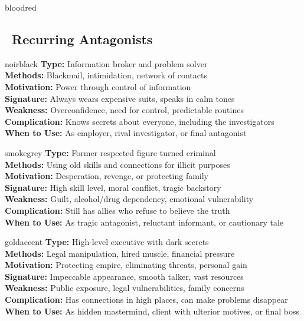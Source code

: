 \documentclass[11pt]{article}
\begin{document}
\begin{noirsection}{bloodred}
\subsection*{\faSkull\ Recurring Antagonists}

\begin{suspectbox}{noirblack}
\textbf{Type:} Information broker and problem solver\\
\textbf{Methods:} Blackmail, intimidation, network of contacts\\
\textbf{Motivation:} Power through control of information\\
\textbf{Signature:} Always wears expensive suits, speaks in calm tones\\
\textbf{Weakness:} Overconfidence, need for control, predictable routines\\
\textbf{Complication:} Knows secrets about everyone, including the investigators\\
\textbf{When to Use:} As employer, rival investigator, or final antagonist
\end{suspectbox}

\begin{suspectbox}{smokegrey}
\textbf{Type:} Former respected figure turned criminal\\
\textbf{Methods:} Using old skills and connections for illicit purposes\\
\textbf{Motivation:} Desperation, revenge, or protecting family\\
\textbf{Signature:} High skill level, moral conflict, tragic backstory\\
\textbf{Weakness:} Guilt, alcohol/drug dependency, emotional vulnerability\\
\textbf{Complication:} Still has allies who refuse to believe the truth\\
\textbf{When to Use:} As tragic antagonist, reluctant informant, or cautionary tale
\end{suspectbox}

\begin{suspectbox}{goldaccent}
\textbf{Type:} High-level executive with dark secrets\\
\textbf{Methods:} Legal manipulation, hired muscle, financial pressure\\
\textbf{Motivation:} Protecting empire, eliminating threats, personal gain\\
\textbf{Signature:} Impeccable appearance, smooth talker, vast resources\\
\textbf{Weakness:} Public exposure, legal vulnerabilities, family concerns\\
\textbf{Complication:} Has connections in high places, can make problems disappear\\
\textbf{When to Use:} As hidden mastermind, client with ulterior motives, or final boss
\end{suspectbox}


\end{noirsection}
\end{document}
